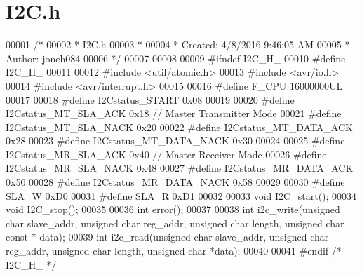 \hypertarget{_i2_c_8h_source}{}\section{I2\+C.\+h}
\label{_i2_c_8h_source}

\begin{DoxyCode}
00001 \textcolor{comment}{/*}
00002 \textcolor{comment}{ * I2C.h}
00003 \textcolor{comment}{ *}
00004 \textcolor{comment}{ * Created: 4/8/2016 9:46:05 AM}
00005 \textcolor{comment}{ *  Author: joneh084}
00006 \textcolor{comment}{ */} 
00007 
00008 
00009 \textcolor{preprocessor}{#ifndef I2C\_H\_}
00010 \textcolor{preprocessor}{#define I2C\_H\_}
00011 
00012 \textcolor{preprocessor}{#include <util/atomic.h>}
00013 \textcolor{preprocessor}{#include <avr/io.h>}
00014 \textcolor{preprocessor}{#include <avr/interrupt.h>}
00015 
00016 \textcolor{preprocessor}{#define F\_CPU 16000000UL}
00017 
00018 \textcolor{preprocessor}{#define I2Cstatus\_START 0x08}
00019 
00020 \textcolor{preprocessor}{#define I2Cstatus\_MT\_SLA\_ACK 0x18       // Master Transmitter Mode}
00021 \textcolor{preprocessor}{#define I2Cstatus\_MT\_SLA\_NACK 0x20}
00022 \textcolor{preprocessor}{#define I2Cstatus\_MT\_DATA\_ACK 0x28}
00023 \textcolor{preprocessor}{#define I2Cstatus\_MT\_DATA\_NACK 0x30}
00024 
00025 \textcolor{preprocessor}{#define I2Cstatus\_MR\_SLA\_ACK 0x40       // Master Receiver Mode}
00026 \textcolor{preprocessor}{#define I2Cstatus\_MR\_SLA\_NACK 0x48}
00027 \textcolor{preprocessor}{#define I2Cstatus\_MR\_DATA\_ACK 0x50}
00028 \textcolor{preprocessor}{#define I2Cstatus\_MR\_DATA\_NACK 0x58}
00029 
00030 \textcolor{preprocessor}{#define SLA\_W 0xD0}
00031 \textcolor{preprocessor}{#define SLA\_R 0xD1}
00032 
00033 \textcolor{keywordtype}{void} I2C\_start();
00034 \textcolor{keywordtype}{void} I2C\_stop();
00035 
00036 \textcolor{keywordtype}{int} error();
00037 
00038 \textcolor{keywordtype}{int} i2c\_write(\textcolor{keywordtype}{unsigned} \textcolor{keywordtype}{char} slave\_addr, \textcolor{keywordtype}{unsigned} \textcolor{keywordtype}{char} reg\_addr, \textcolor{keywordtype}{unsigned} \textcolor{keywordtype}{char} length, \textcolor{keywordtype}{unsigned} \textcolor{keywordtype}{char} \textcolor{keyword}{const} *
      data);
00039 \textcolor{keywordtype}{int} i2c\_read(\textcolor{keywordtype}{unsigned} \textcolor{keywordtype}{char} slave\_addr, \textcolor{keywordtype}{unsigned} \textcolor{keywordtype}{char} reg\_addr, \textcolor{keywordtype}{unsigned} \textcolor{keywordtype}{char} length, \textcolor{keywordtype}{unsigned} \textcolor{keywordtype}{char} *data);
00040 
00041 \textcolor{preprocessor}{#endif }\textcolor{comment}{/* I2C\_H\_ */}\textcolor{preprocessor}{}
\end{DoxyCode}
